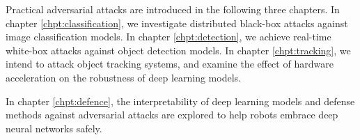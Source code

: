 Practical adversarial attacks are introduced in the following three chapters. In chapter \ref{chpt:classification}, we investigate distributed black-box attacks against image classification models. In chapter \ref{chpt:detection}, we achieve real-time white-box attacks against object detection models. In chapter \ref{chpt:tracking}, we intend to attack object tracking systems, and examine the effect of hardware acceleration on the robustness of deep learning models. 


In chapter \ref{chpt:defence}, the interpretability of deep learning models and defense methods against adversarial attacks are explored to help robots embrace deep neural networks safely.







